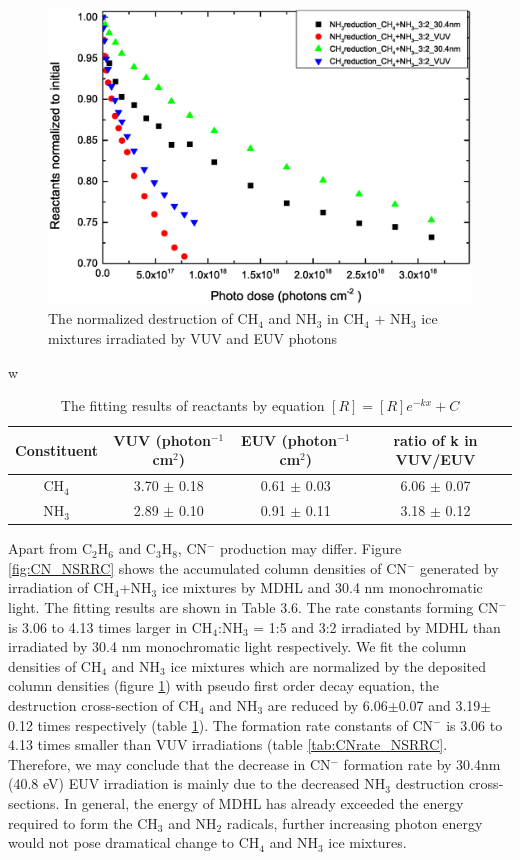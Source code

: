 \begin{figure}
\centering
\includegraphics[width=\textwidth]{figures/chapter3/Reactants_normalized_to_initial.eps}
\caption{The normalized destruction of CH$_4$ and NH$_3$ in CH$_4$ + NH$_3$ ice mixtures irradiated by VUV and EUV photons}
\label{fig:normalized_reactants}
\end{figure}
w
\begin{table}[htbp]
\caption{The fitting results of reactants by equation $[R]=[R]e^{-kx}+C$}
\label{tab:reactants}
\begin{tabular}{cccc}
\hline
\hline
Constituent & VUV (photon$^{-1}$cm$^2$) & EUV (photon$^{-1}$cm$^2$) & ratio of k in VUV/EUV\\
\hline
CH$_4$ & 3.70 $\pm$ 0.18 & 0.61 $\pm$ 0.03 & 6.06 $\pm$ 0.07\\
NH$_3$ & 2.89 $\pm$ 0.10 & 0.91 $\pm$ 0.11 & 3.18 $\pm$ 0.12\\
\hline
\end{tabular}
\end{table}

Apart from C$_2$H$_6$ and C$_3$H$_8$, CN$^-$ production may differ. Figure \ref{fig:CN_NSRRC} shows the accumulated column densities of CN$^-$ generated by irradiation of CH$_4$+NH$_3$ ice mixtures by MDHL and 30.4 nm monochromatic light. The fitting results are shown in Table 3.6. The rate constants forming CN$^-$ is 3.06 to 4.13 times larger in CH$_4$:NH$_3$ = 1:5 and 3:2 irradiated by MDHL than irradiated by 30.4 nm monochromatic light respectively. We fit the column densities of CH$_4$ and NH$_3$ ice mixtures which are normalized by the deposited column densities (figure \ref{fig:normalized_reactants}) with pseudo first order decay equation, the destruction cross-section of CH$_4$ and NH$_3$ are reduced by 6.06$\pm$0.07 and 3.19$\pm$0.12 times respectively (table \ref{tab:reactants}). The formation rate constants of CN$^-$ is 3.06 to 4.13 times smaller than VUV irradiations (table \ref{tab:CNrate_NSRRC}. Therefore, we may conclude that the decrease in CN$^-$ formation rate by 30.4nm (40.8 eV) EUV irradiation is mainly due to the decreased NH$_3$ destruction cross-sections. In general, the energy of MDHL has already exceeded the energy required to form the CH$_3$ and NH$_2$ radicals, further increasing photon energy would not pose dramatical change to CH$_4$ and NH$_3$ ice mixtures.\\

